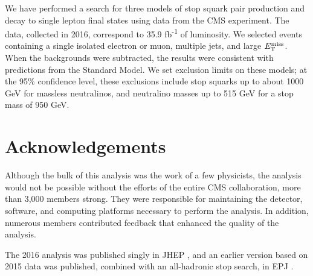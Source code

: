 We have performed a search for three models of stop squark pair production
and decay to single lepton final states using data from the CMS
experiment. The data, collected in 2016, correspond to 35.9
fb\textsuperscript{-1} of luminosity. We selected events containing a
single isolated electron or muon, multiple jets, and large
$E_\text{T}^\text{miss}$. When the backgrounds were subtracted, the results were
consistent with predictions from the Standard Model. We set exclusion
limits on these models; at the 95\% confidence level, these exclusions
include stop squarks up to about 1000 GeV for massless neutralinos,
and neutralino masses up to 515 GeV for a stop mass of 950 GeV.

\section{Acknowledgements}
\label{sec:stop:acknowledgements}

Although the bulk of this analysis was the work of a few physicists,
the analysis would not be possible without the efforts of the entire
CMS collaboration, more than 3,000 members strong. They were responsible
for maintaining the detector, software, and computing platforms
necessary to perform the analysis. In addition, numerous members
contributed feedback that enhanced the quality of the analysis.

The 2016 analysis was published singly in JHEP \cite{stop1l}, and an
earlier version based on 2015 data was published, combined with an
all-hadronic stop search, in EPJ \cite{combination0l}.
